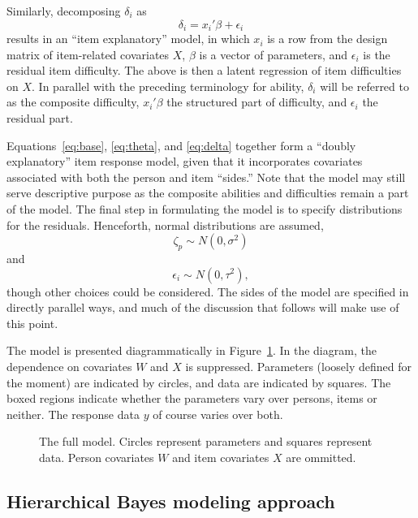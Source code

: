 \documentclass[12pt, letterpaper]{article}
\begin{document}
Similarly, decomposing $\delta_i$ as
\begin{equation} \label{eq:delta}
	\delta_i = x_i' \beta + \epsilon_i
\end{equation}
results in an ``item explanatory'' model, in which $x_i$ is a row from the design matrix of item-related covariates $X$, $\beta$ is a vector of parameters, and $\epsilon_i$ is the residual item difficulty. The above is then a latent regression of item difficulties on $X$. In parallel with the preceding terminology for ability, $\delta_i$ will be referred to as the composite difficulty, $x_i' \beta$ the structured part of difficulty, and $\epsilon_i$ the residual part. 

Equations~\ref{eq:base}, \ref{eq:theta}, and \ref{eq:delta} together form a ``doubly explanatory'' item response model, given that it incorporates covariates associated with both the person and item ``sides.'' Note that the model may still serve descriptive purpose as the composite abilities and difficulties remain a part of the model. The final step in formulating the model is to specify distributions for the residuals. Henceforth, normal distributions are assumed, 
\begin{equation}
	\zeta_p \sim N(0, \sigma^2)
\end{equation}
and
\begin{equation}
	\epsilon_i \sim N(0, \tau^2)
,\end{equation}
though other choices could be considered. The sides of the model are specified in directly parallel ways, and much of the discussion that follows will make use of this point.

The model is presented diagrammatically in Figure~\ref{fig:eirm-model}. In the diagram, the dependence on covariates $W$ and $X$ is suppressed. Parameters (loosely defined for the moment) are indicated by circles, and data are indicated by squares. The boxed regions indicate whether the parameters vary over persons, items or neither. The response data $y$ of course varies over both.

\begin{figure}[btp]
	\centering
	
	\caption{The full model. Circles represent parameters and squares represent data. Person covariates $W$ and item covariates $X$ are ommitted.}
	\label{fig:eirm-model}
\end{figure}


\subsection{Hierarchical Bayes modeling approach}
\end{document}
